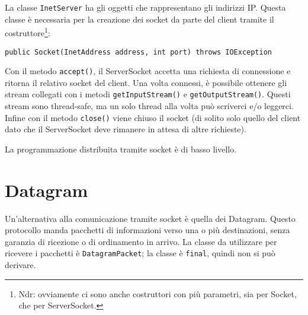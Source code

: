 La classe \texttt{InetServer} ha gli oggetti che rappresentano gli indirizzi IP. Questa classe è necessaria per la creazione dei socket da parte del client tramite il costruttore\footnote{Ndr: ovviamente ci sono anche costruttori con più parametri, sia per Socket, che per ServerSocket.}:
\begin{lstlisting}
public Socket(InetAddress address, int port) throws IOException
\end{lstlisting}
Con il metodo \texttt{accept()}, il ServerSocket accetta una richiesta di connessione e ritorna il relativo socket del client. Una volta connessi, è possibile ottenere gli stream collegati con i metodi \texttt{getInputStream()} e \texttt{getOutputStream()}. Questi stream sono thread-safe, ma un solo thread alla volta può scriverci e/o leggerci. Infine con il metodo \texttt{close()} viene chiuso il socket (di solito solo quello del client dato che il ServerSocket deve rimanere in attesa di altre richieste). 

La programmazione distribuita tramite socket è di basso livello.

\section{Datagram}
Un'alternativa alla comunicazione tramite socket è quella dei Datagram. Questo protocollo manda pacchetti di informazioni verso una o più destinazioni, senza garanzia di ricezione o di ordinamento in arrivo. La classe da utilizzare per ricevere i pacchetti è \texttt{DatagramPacket}; la classe è \texttt{final}, quindi non si può derivare. 


